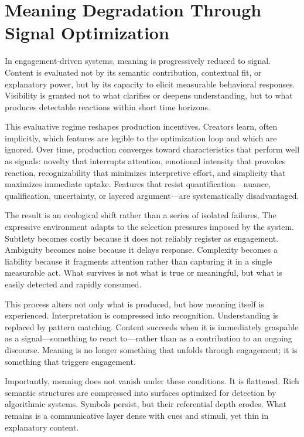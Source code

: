 \documentclass[12pt]{article}
\begin{document}
\section{Meaning Degradation Through Signal Optimization}

In engagement-driven systems, meaning is progressively reduced to signal. Content is evaluated not by its semantic contribution, contextual fit, or explanatory power, but by its capacity to elicit measurable behavioral responses. Visibility is granted not to what clarifies or deepens understanding, but to what produces detectable reactions within short time horizons.

This evaluative regime reshapes production incentives. Creators learn, often implicitly, which features are legible to the optimization loop and which are ignored. Over time, production converges toward characteristics that perform well as signals: novelty that interrupts attention, emotional intensity that provokes reaction, recognizability that minimizes interpretive effort, and simplicity that maximizes immediate uptake. Features that resist quantification—nuance, qualification, uncertainty, or layered argument—are systematically disadvantaged.

The result is an ecological shift rather than a series of isolated failures. The expressive environment adapts to the selection pressures imposed by the system. Subtlety becomes costly because it does not reliably register as engagement. Ambiguity becomes noise because it delays response. Complexity becomes a liability because it fragments attention rather than capturing it in a single measurable act. What survives is not what is true or meaningful, but what is easily detected and rapidly consumed.

This process alters not only what is produced, but how meaning itself is experienced. Interpretation is compressed into recognition. Understanding is replaced by pattern matching. Content succeeds when it is immediately graspable as a signal—something to react to—rather than as a contribution to an ongoing discourse. Meaning is no longer something that unfolds through engagement; it is something that triggers engagement.

Importantly, meaning does not vanish under these conditions. It is flattened. Rich semantic structures are compressed into surfaces optimized for detection by algorithmic systems. Symbols persist, but their referential depth erodes. What remains is a communicative layer dense with cues and stimuli, yet thin in explanatory content.
\end{document}
